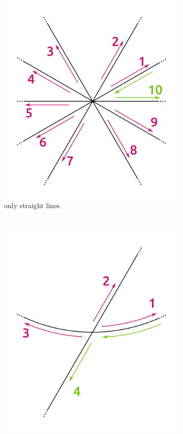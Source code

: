 \begin{figure}%
  \centering
  \begin{subfigure}{.32\textwidth}
    \includegraphics[width=\textwidth]{figures/subd_findNextHalfEdge_a.png}
    \caption{only straight lines} \label{subfig:subd_findNextHalfEdge_a}
  \end{subfigure}%
  ~%
  \begin{subfigure}{.32\textwidth}
    \includegraphics[width=\textwidth]{figures/subd_findNextHalfEdge_b.png}

\end{subfigure}
\end{figure}
